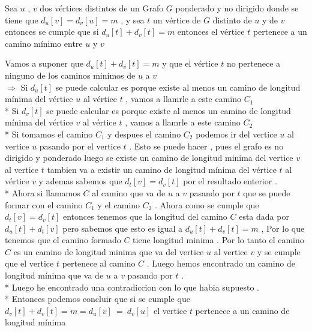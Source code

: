 \documentclass{article}
\begin{document}
    \begin{thm}
        Sea $u$ , $v$ dos v\'ertices distintos de un Grafo  $G$ ponderado y no dirigido donde se tiene  que $d_u\left[v\right] = d_v\left[u\right] = m $  , y sea $t$ un v\'ertice de $G$ distinto de $u$ y de $v$ entonces se cumple que si
        $d_u\left[t\right] + d_v\left[t\right] = m $ entonces el v\'ertice $t$ pertenece a un camino m\'inimo entre $u$ y $v$  
    \end{thm}

    Vamos a suponer que $d_u\left[t\right] + d_v\left[t\right] = m $ y que el v\'ertice $t$ no pertenece a ninguno de los caminos minimos de $u$ a $v$ 
    \\[5pt] 
    $\Rightarrow$ Si $d_u\left[t\right]$ se puede calcular es porque existe  al menos un camino de longitud m\'inima del v\'ertice $u$ al v\'ertice  $t$  , vamos a llamrle a este camino $C_1$
    \\*
    Si $d_v\left[t\right]$ se puede calcular es porque existe  al menos un camino de longitud m\'inima del v\'ertice $v$ al v\'ertice  $t$  , vamos a llamrle a este camino $C_2$
    \\*
    Si tomamos el camino $C_1$ y despues el camino $C_2$ podemos ir del vertice $u$ al vertice $u$ pasando por el vertice $t$ . Esto se puede hacer , pues el grafo es no dirigido y ponderado luego se existe un camino de longitud minima del vertice $v$ al vertice $t$ tambien va 
    a existir un camino de longitud m\'inima del v\'ertice $t$ al v\'ertice $v$ y ademas sabemos que $d_t\left[v\right] = d_v\left[t\right]$ por el resultado enterior .
    \\*
    Ahora si llamamos $C$ al camino que va de $u$ a $v$ pasando por $t$ que se puede formar con el camino $C_1$ y el camino $C_2$  . Ahora como se cumple que $d_t\left[v\right] = d_v\left[t\right]$  entonces tenemos que la longitud del camino $C$ esta dada por $d_u\left[t\right] + d_t\left[v\right]$ pero sabemos que esto es igual a 
    $d_u\left[t\right] + d_v\left[t\right] = m $ , Por lo que tenemos que el camino formado $C$ tiene longitud minima . Por lo tanto el camino $C$ es un camino de longitud minima que va del vertice $u$ al vertice $v$ y se cumple que el vertice $t$ pertenece al camino $C$ . Luego hemos encontrado un camino de longitud m\'inima que va de $u$ a $v$ pasando por $t$ .
    \\*
    Luego he encontrado una contradiccion con lo que habia supuesto . 
    \\* 
    Entonces podemos concluir que si se cumple que $d_v\left[t\right] + d_v\left[t\right] = m = d_u\left[v\right] ~=~ d_v\left[u\right]$    el vertice $t$ pertenece a un camino de longitud m\'inima    
    
\end{document}
